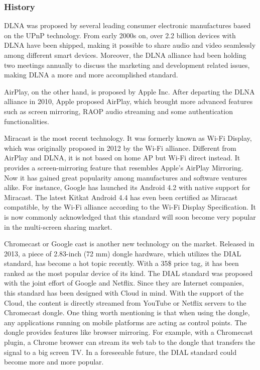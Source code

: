 \subsubsection{History\label{2_3_1}} 
DLNA was proposed by several leading consumer electronic manufactures based on
the UPnP technology. From early 2000s on, over 2.2 billion devices with DLNA
have been shipped, making it possible to share audio and video seamlessly among
different smart devices. Moreover, the DLNA alliance had been holding two
meetings annually to discuss the marketing and development related issues,
making DLNA a more and more accomplished standard.

AirPlay, on the other hand, is proposed by Apple Inc. After departing the DLNA alliance in 2010, Apple proposed AirPlay, which brought more advanced features such as screen mirroring, RAOP audio streaming and some authentication functionalities.

Miracast is the most recent technology. It was formerly known as Wi-Fi Display,
which was originally proposed in 2012 by the Wi-Fi alliance. Different from
AirPlay and DLNA, it is not based on home AP but Wi-Fi direct instead. It
provides a screen-mirroring feature that resembles Apple's AirPlay Mirroring.
Now it has gained great popularity among manufactures and software ventures
alike. For instance, Google has launched its Android 4.2 with native support
for Miracast. The latest Kitkat Android 4.4 has even been certified as Miracast
compatible, by the Wi-Fi alliance according to the Wi-Fi Display Specification.
It is now commonly acknowledged that this standard will soon become very
popular in the multi-screen sharing market.

Chromecast or Google cast is another new technology on the market. Released in
2013, a piece of 2.83-inch (72 mm) dongle hardware, which utilizes the DIAL
standard, has become a hot topic recently. With a 35\$ price tag, it has been
ranked as the most popular device of its kind. The DIAL standard was proposed
with the joint effort of Google and Netflix. Since they are Internet companies,
this standard has been designed with Cloud in mind. With the support of the
Cloud, the content is directly streamed from YouTube or Netflix servers to the
Chromecast dongle. One thing worth mentioning is that when using the dongle,
any applications running on mobile platforms are acting as control points. The
dongle provides features like browser mirroring. For example, with a Chromecast
plugin, a Chrome browser can stream its web tab to the dongle that transfers
the signal to a big screen TV. In a foreseeable future, the DIAL standard could
become more and more popular.
